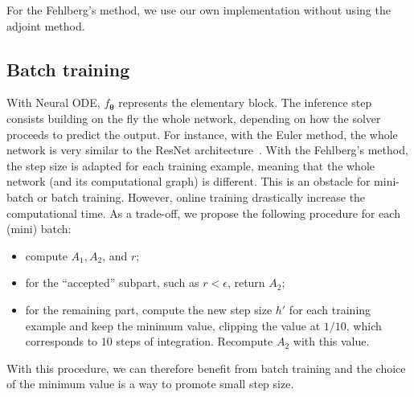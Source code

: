 \documentclass{article}
\newcommand{\eps}{\ensuremath{\epsilon}}
\newcommand{\params}{\ensuremath{\boldsymbol{\theta}}}
\newcommand{\nnet}{\ensuremath{f_{\params}}}
\begin{document}
For the Fehlberg's method, we use our own implementation without using
the adjoint method.


\subsection{Batch training}
\label{ssec:batch}


With Neural ODE, $\nnet$ represents the elementary block. The inference
step consists building on the fly the whole network, depending on how
the solver proceeds to predict the output. For instance, with the
Euler method, the whole network is very similar to the ResNet
architecture~\cite{He16Deep,Haber17Stable,Lu18Beyond}.  With the
Fehlberg's method, the step size is adapted for each training example,
meaning that the whole network (and its computational graph) is
different. This is an obstacle for mini-batch or batch training.
However, online training drastically increase the computational time.
As a trade-off, we propose the following procedure for each (mini)
batch:
\begin{itemize}
\item compute $A_1, A_2$, and $r$;
\item for the  ``accepted'' subpart, such as $r<\eps$,  return $A_2$;
\item for the remaining part, compute the new step size $h'$ for each
  training example and keep the minimum value, clipping the value at
  $1/10$, which corresponds to $10$ steps of integration. Recompute
  $A_2$ with this value.
\end{itemize}
With this procedure, we can therefore benefit from batch training and
the choice of the minimum value is a way to promote small step size.
\end{document}
